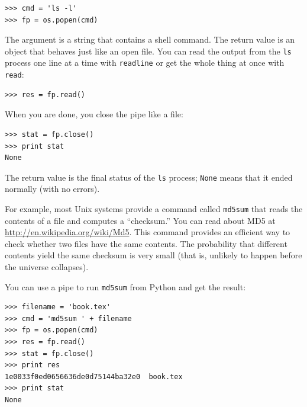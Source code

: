 \documentclass[10pt]{book}
\begin{document}
\begin{verbatim}
>>> cmd = 'ls -l'
>>> fp = os.popen(cmd)
\end{verbatim}
%
The argument is a string that contains a shell command.  The
return value is an object that behaves just like an open
file.  You can read the output from the {\tt ls} process one
line at a time with {\tt readline} or get the whole thing at
once with {\tt read}:

\begin{verbatim}
>>> res = fp.read()
\end{verbatim}
%
When you are done, you close the pipe like a file:

\begin{verbatim}
>>> stat = fp.close()
>>> print stat
None
\end{verbatim}
%
The return value is the final status of the {\tt ls} process;
{\tt None} means that it ended normally (with no errors).

For example, most Unix systems provide a command called {\tt md5sum}
that reads the contents of a file and computes a ``checksum.''
You can read about MD5 at \url{http://en.wikipedia.org/wiki/Md5}.  This
command provides an efficient way to check whether two files
have the same contents.  The probability that different contents
yield the same checksum is very small (that is, unlikely to happen
before the universe collapses).

You can use a pipe to run {\tt md5sum} from Python and get the result:

\begin{verbatim}
>>> filename = 'book.tex'
>>> cmd = 'md5sum ' + filename
>>> fp = os.popen(cmd)
>>> res = fp.read()
>>> stat = fp.close()
>>> print res
1e0033f0ed0656636de0d75144ba32e0  book.tex
>>> print stat
None
\end{verbatim}
\end{document}
